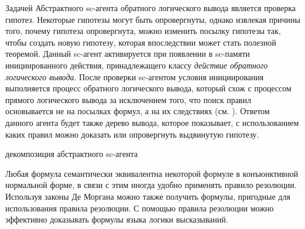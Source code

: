 Задачей Абстрактного sc-агента обратного логического вывода является проверка гипотез. Некоторые гипотезы могут быть опровергнуты, однако извлекая причины того, почему гипотеза опровергнута, можно изменить посылку гипотезы так, чтобы создать новую гипотезу, которая впоследствии может стать полезной теоремой. Данный sc-агент активируется при появлении в sc-памяти инициированного действия, принадлежащего классу \textit{действие обратного логического вывода}. После проверки sc-агентом условия инициирования выполняется процесс обратного логического вывода, который схож с процессом прямого логического вывода за исключением того, что поиск правил основывается не на посылках формул, а на их следствиях (см.  ). Ответом данного агента будет также дерево вывода, которое показывает, с использованием каких правил можно доказать или опровергнуть выдвинутую гипотезу.

\begin{SCn}
	\begin{scnrelfromset}{декомпозиция абстрактного sc-агента}
	\end{scnrelfromset}
\end{SCn}

Любая формула семантически эквивалентна некоторой формуле в конъюнктивной нормальной форме, в связи с этим иногда удобно применять правило резолюции. Используя законы Де Моргана можно также получить формулы, пригодные для использования правила резолюции.
С помощью правила резолюции можно эффективно доказывать формулы языка логики высказываний.

